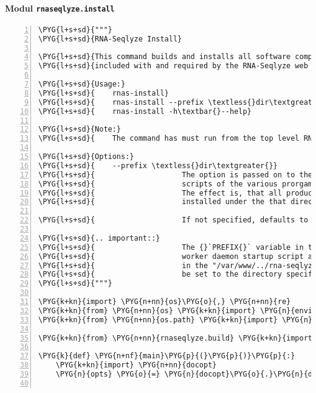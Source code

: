 \paragraph{Modul \texttt{rnaseqlyze.install}}
\label{rnaseqlyze-pdf:modul-rnaseqlyze-install}
\begin{Verbatim}[commandchars=\\\{\},numbers=left,firstnumber=1,stepnumber=5]
\PYG{l+s+sd}{"""}
\PYG{l+s+sd}{RNA-Seqlyze Install}

\PYG{l+s+sd}{This command builds and installs all software components}
\PYG{l+s+sd}{included with and required by the RNA-Seqlyze web application.}

\PYG{l+s+sd}{Usage:}
\PYG{l+s+sd}{    rnas-install}
\PYG{l+s+sd}{    rnas-install --prefix \textless{}dir\textgreater{}}
\PYG{l+s+sd}{    rnas-install -h\textbar{}--help}

\PYG{l+s+sd}{Note:}
\PYG{l+s+sd}{    The command has must run from the top level RNA-Seqlyze source directory.}

\PYG{l+s+sd}{Options:}
\PYG{l+s+sd}{    --prefix \textless{}dir\textgreater{}}
\PYG{l+s+sd}{                    The option is passed on to the ./configure and install}
\PYG{l+s+sd}{                    scripts of the various prorgams that this command installs.}
\PYG{l+s+sd}{                    The effect is, that all produced executables will be}
\PYG{l+s+sd}{                    installed under the that directory.}

\PYG{l+s+sd}{                    If not specified, defaults to {}`{}`\PYGZdl{}HOME/.local{}`{}`}

\PYG{l+s+sd}{.. important::}
\PYG{l+s+sd}{                    The {}`PREFIX{}` variable in the "/etc/init.d/rnaseqlyze.sh"}
\PYG{l+s+sd}{                    worker daemon startup script and the {}`prefix{}` variable}
\PYG{l+s+sd}{                    in the "/var/www/../rna-seqlyze.wsgi" script must both}
\PYG{l+s+sd}{                    be set to the directory specified here!}
\PYG{l+s+sd}{"""}

\PYG{k+kn}{import} \PYG{n+nn}{os}\PYG{o}{,} \PYG{n+nn}{re}
\PYG{k+kn}{from} \PYG{n+nn}{os} \PYG{k+kn}{import} \PYG{n}{environ} \PYG{k}{as} \PYG{n}{env}
\PYG{k+kn}{from} \PYG{n+nn}{os.path} \PYG{k+kn}{import} \PYG{n}{join}\PYG{p}{,} \PYG{n}{exists}

\PYG{k+kn}{from} \PYG{n+nn}{rnaseqlyze.build} \PYG{k+kn}{import} \PYG{n}{parts}\PYG{p}{,} \PYG{n}{phases}

\PYG{k}{def} \PYG{n+nf}{main}\PYG{p}{(}\PYG{p}{)}\PYG{p}{:}
    \PYG{k+kn}{import} \PYG{n+nn}{docopt}
    \PYG{n}{opts} \PYG{o}{=} \PYG{n}{docopt}\PYG{o}{.}\PYG{n}{docopt}\PYG{p}{(}\PYG{n}{\PYGZus{}\PYGZus{}doc\PYGZus{}\PYGZus{}}\PYG{p}{)}


\end{Verbatim}
